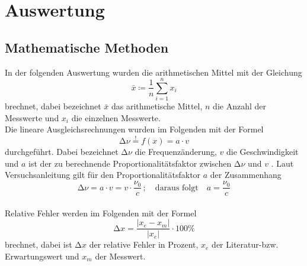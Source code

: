 \section{Auswertung}
\label{sec:Auswertung}
\subsection{Mathematische Methoden}
In der folgenden Auswertung wurden die arithmetischen Mittel mit der
Gleichung
\begin{equation}
  \bar{x} \coloneq \frac{1}{n} \sum_{i=1}^n x_i
  \label{eqn:aM}
\end{equation}
brechnet, dabei bezeichnet $\bar{x}$ das arithmetische Mittel, $n$ die Anzahl
der Messwerte und $x_i$ die einzelnen Messwerte. \\
Die lineare Ausgleichsrechnungen wurden im Folgenden mit der
Formel
\begin{equation}
  \increment \nu \stackrel{!}{=} f(x) = a\cdot v
  \label{eqn:fit}
\end{equation}
durchgeführt. Dabei bezeichnet $\increment \nu$ die Frequenzänderung, $v$ die
Geschwindigkeit und $a$ ist der zu berechnende Proportionalitätsfaktor zwischen
$ \increment \nu $ und $v$ . Laut Versuchsanleitung \cite{Anleitung} gilt für den
Proportionalitätsfaktor $a$ der Zusammenhang
\begin{equation}
  \increment \nu = a\cdot v = v\cdot\frac{\nu_0}{c} \, ; \quad \text{daraus folgt} \quad
  a = \frac{\nu_0}{c}
  \label{eqn:a}
\end{equation}
\\
Relative Fehler werden im Folgenden mit der Formel
\begin{equation*}
  \increment x = \frac{\lvert x_e - x_m \rvert}{\lvert x_e \rvert}\cdot 100\%
\end{equation*}
brechnet, dabei ist $\increment x $ der relative Fehler in Prozent, $x_e$ der
Literatur-bzw. Erwartungswert und $ x_m$ der Messwert.
